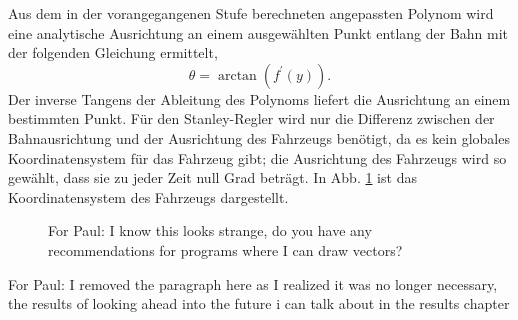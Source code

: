 \documentclass[arbeit=studie,oneside,BCOR=12mm]{ArbeitRST}
\begin{document}
Aus dem in der vorangegangenen Stufe berechneten angepassten Polynom wird eine
analytische Ausrichtung an einem ausgewählten Punkt entlang der Bahn mit der
folgenden Gleichung ermittelt, 
\begin{equation} 
    \theta = \arctan(f^\prime(y)).
\end{equation} 
Der inverse Tangens der Ableitung des Polynoms liefert die
Ausrichtung an einem bestimmten Punkt. Für den Stanley-Regler wird nur die
Differenz zwischen der Bahnausrichtung und der Ausrichtung des Fahrzeugs
benötigt, da es kein globales Koordinatensystem für das Fahrzeug gibt; die
Ausrichtung des Fahrzeugs wird so gewählt, dass sie zu jeder Zeit null Grad
beträgt. In Abb. \ref{ausrichtung} ist das Koordinatensystem des Fahrzeugs
dargestellt. 

\begin{figure}[h]
    \centering
    \caption{For Paul: I know this looks strange, do you have any recommendations for programs where I can draw vectors?}
    \label{ausrichtung}
\end{figure}

For Paul: I removed the paragraph here as I realized it was no longer necessary, 
the results of looking ahead into the future i can talk about in the results chapter

\end{document}
